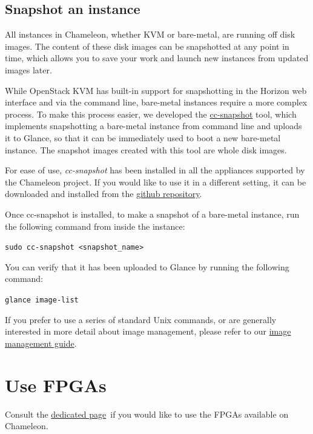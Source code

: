 \subsection{\texorpdfstring{{Snapshot an
instance}}{Snapshot an instance}}\label{snapshot-an-instance}

All instances in Chameleon, whether KVM or bare-metal, are running off
disk images. The content of these disk images can be snapshotted at any
point in time, which allows you to save your work and launch new
instances from updated images later.

While OpenStack KVM has built-in support for snapshotting in the Horizon
web interface and via the command line, bare-metal instances require a
more complex process. To make this process easier,{ we developed the
\href{https://github.com/ChameleonCloud/ChameleonSnapshotting}{cc-snapshot}
tool, which implements snapshotting a bare-metal instance from command
line and uploads it to Glance, so that it can be immediately used to
boot a new bare-metal instance. The snapshot images created with this
tool are whole disk images.}

{For ease of use, \emph{cc-snapshot} has been installed in all the
appliances supported by the Chameleon project. If you would like to use
it in a different setting, it can be downloaded and installed from the
\href{https://github.com/ChameleonCloud/ChameleonSnapshotting}{github
repository}.}

{Once cc-snapshot is installed, to make a snapshot of a bare-metal
instance, run the following command from inside the instance:}

{\texttt{sudo\ cc-snapshot\ \textless{}snapshot\_name\textgreater{}}}

{You can verify that it has been uploaded to Glance by running the
following command:}

{\texttt{glance\ image-list}}

{If you prefer to use a series of standard Unix commands, or are
generally interested in more detail about image management, please refer
to our
\href{https://www.chameleoncloud.org/docs/user-guides/ironic/\#snapshotting_an_instance}{image
management guide}.}

\section{Use FPGAs}\label{use-fpgas}

Consult the
\href{https://www.chameleoncloud.org/docs/bare-metal-user-guide/fpga/}{dedicated
page}~if you would like to use the FPGAs available on Chameleon.

